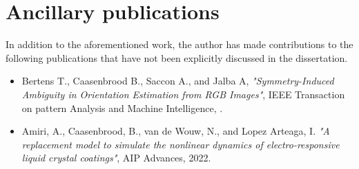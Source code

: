 \section*{Ancillary publications}
In addition to the aforementioned work, the author has made contributions to the following publications that have not been explicitly discussed in the dissertation.
\begin{itemize}[leftmargin=2mm]
\small 
\item Bertens T., Caasenbrood B., Saccon A., and Jalba A, \textit{"Symmetry-Induced Ambiguity in Orientation Estimation from RGB Images"}, IEEE Transaction on pattern Analysis and Machine Intelligence, \ipj.

\item Amiri, A., Caasenbrood, B., van de Wouw, N., and Lopez Arteaga, I. \textit{"A replacement model to simulate the nonlinear dynamics of electro-responsive liquid crystal coatings"}, AIP Advances, 2022.
\end{itemize}

